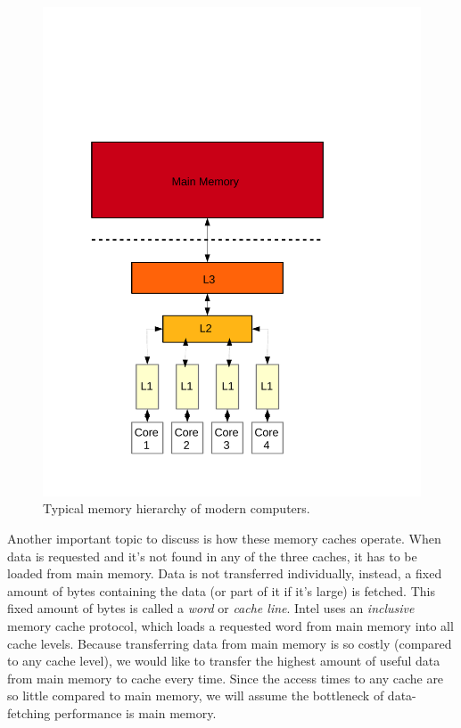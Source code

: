 \documentclass[12pt]{diicc}
\begin{document}
\begin{figure}[h!]
	\centering
		\includegraphics[width=1.0\textwidth]{cache}
	\caption{Typical memory hierarchy of modern computers.}
	\label{fig:cache}
\end{figure}
 
Another important topic to discuss is how these memory caches operate. When data is requested and it's not found in any of the three caches, it has to be loaded from main memory. Data is not transferred individually, instead, a fixed amount of bytes containing the data (or part of it if it's large) is fetched. This fixed amount of bytes is called a \textit{word} or \textit{cache line}. Intel uses an \textit{inclusive} memory cache protocol, which loads a requested word from main memory into all cache levels. 
Because transferring data from main memory is so costly (compared to any cache level), we would like to transfer the highest amount of useful data from main memory to cache every time. Since the access times to any cache are so little compared to main memory, we will assume the bottleneck of data-fetching performance is main memory. 
\end{document}

